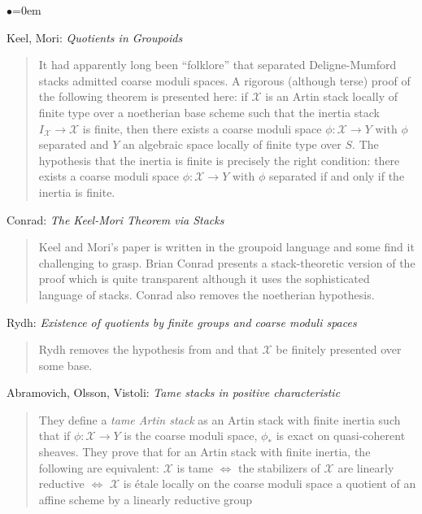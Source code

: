 \begin{list}{$\bullet$}{\leftmargin=0em}
\item Keel, Mori: \emph{Quotients in Groupoids} \cite{keel-mori}
\begin{quote}
It had apparently long been ``folklore'' that separated Deligne-Mumford stacks 
admitted coarse moduli spaces. A rigorous (although terse) proof of the 
following theorem is presented here: if $\mathcal{X}$ is an Artin stack 
locally of 
finite type over a noetherian base scheme such that the inertia stack 
$I_\mathcal{X} 
\to \mathcal{X}$ is finite, then there exists a coarse moduli space $\phi: 
\mathcal{X} \to Y$ 
with $\phi$ separated and $Y$ an algebraic space locally of finite type over 
$S$. The hypothesis that the inertia is finite is precisely the right 
condition: there exists a coarse moduli space $\phi: \mathcal{X} \to Y$ with 
$\phi$ 
separated if and only if the inertia is finite. 
\end{quote}
\smallskip
\item Conrad: \emph{The Keel-Mori Theorem via Stacks} \cite{conrad} 
\begin{quote}
Keel and Mori's paper \cite{keel-mori} is written in the groupoid language and 
some find it challenging to grasp. Brian Conrad presents a stack-theoretic 
version of the proof which is quite transparent although it uses the 
sophisticated language of stacks. Conrad also removes the noetherian 
hypothesis.
\end{quote}
\smallskip
\item Rydh: \emph{Existence of quotients by finite groups and coarse moduli
spaces} \cite{rydh_quotients}
\begin{quote}
Rydh removes the hypothesis from \cite{keel-mori} and \cite{conrad} that 
$\mathcal{X}$ 
be finitely presented over some base. 
\end{quote}
\smallskip
\item
Abramovich, Olsson, Vistoli: \emph{Tame stacks in positive characteristic} 
\cite{tame}
\begin{quote}
They define a \emph{tame Artin stack} as an Artin stack with finite inertia 
such that if $\phi: \mathcal{X} \to Y$ is the coarse moduli space, $\phi_*$ is 
exact 
on quasi-coherent sheaves. They prove that for an Artin stack with finite 
inertia, the following are equivalent: $\mathcal{X}$ is tame $\iff$ the 
stabilizers of 
$\mathcal{X}$ are linearly reductive $\iff$ $\mathcal{X}$ is \'etale locally on 
the coarse 
moduli space a quotient of an affine scheme by a linearly reductive group 

\end{quote}
\end{list}
